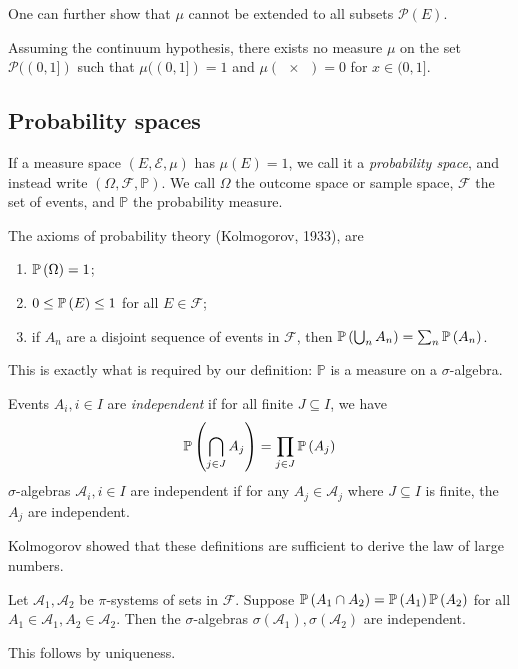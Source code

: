 One can further show that \( \mu \) cannot be extended to all subsets \( \mathcal P(E) \).
\begin{theorem}
	Assuming the continuum hypothesis, there exists no measure \( \mu \) on the set \( \mathcal P((0,1]) \) such that \( \mu((0,1]) = 1 \) and \( \mu(\qty{x}) = 0 \) for \( x \in (0,1] \).
\end{theorem}

\subsection{Probability spaces}
\begin{definition}
	If a measure space \( (E, \mathcal E, \mu) \) has \( \mu(E) = 1 \), we call it a \emph{probability space}, and instead write \( (\Omega, \mathcal F, \mathbb P) \).
	We call \( \Omega \) the outcome space or sample space, \( \mathcal F \) the set of events, and \( \mathbb P \) the probability measure.
\end{definition}
The axioms of probability theory (Kolmogorov, 1933), are
\begin{enumerate}
	\item \( \mathbb{P}\left({\Omega}\right) = 1 \);
	\item \( 0 \leq \mathbb{P}\left({E}\right) \leq 1 \) for all \( E \in \mathcal F \);
	\item if \( A_n \) are a disjoint sequence of events in \( \mathcal F \), then \( \mathbb{P}\left({\bigcup_n A_n}\right) = \sum_n \mathbb{P}\left({A_n}\right) \).
\end{enumerate}
This is exactly what is required by our definition: \( \mathbb P \) is a measure on a \( \sigma \)-algebra.
\begin{definition}
	Events \( A_i, i \in I \) are \emph{independent} if for all finite \( J \subseteq I \), we have
	\[ \mathbb{P}\left({\bigcap_{j \in J} A_j}\right) = \prod_{j \in J} \mathbb{P}\left({A_j}\right) \]
	\( \sigma \)-algebras \( \mathcal A_i, i \in I \) are independent if for any \( A_j \in \mathcal A_j \) where \( J \subseteq I \) is finite, the \( A_j \) are independent.
\end{definition}
Kolmogorov showed that these definitions are sufficient to derive the law of large numbers.
\begin{proposition}
	Let \( \mathcal A_1, \mathcal A_2 \) be \( \pi \)-systems of sets in \( \mathcal F \).
	Suppose \( \mathbb{P}\left({A_1 \cap A_2}\right) = \mathbb{P}\left({A_1}\right) \mathbb{P}\left({A_2}\right) \) for all \( A_1 \in \mathcal A_1, A_2 \in \mathcal A_2 \).
	Then the \( \sigma \)-algebras \( \sigma(\mathcal A_1), \sigma(\mathcal A_2) \) are independent.
\end{proposition}
This follows by uniqueness.

